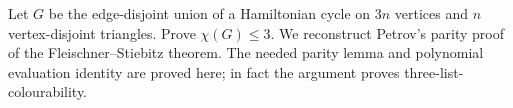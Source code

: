 Let $G$ be the edge-disjoint union of a Hamiltonian cycle on $3n$ vertices and $n$ vertex-disjoint triangles. Prove $\chi(G)\le3$. We reconstruct Petrov's parity proof of the Fleischner--Stiebitz theorem. The needed parity lemma and polynomial evaluation identity are proved here; in fact the argument proves three-list-colourability.
